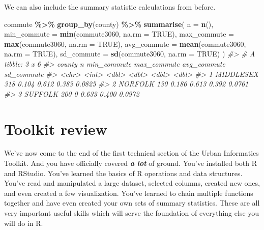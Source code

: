 \documentclass[
]{book}
\newenvironment{Shaded}{\begin{snugshade}}{\end{snugshade}}
\newcommand{\CommentTok}[1]{\textcolor[rgb]{0.56,0.35,0.01}{\textit{#1}}}
\newcommand{\DataTypeTok}[1]{\textcolor[rgb]{0.13,0.29,0.53}{#1}}
\newcommand{\KeywordTok}[1]{\textcolor[rgb]{0.13,0.29,0.53}{\textbf{#1}}}
\newcommand{\NormalTok}[1]{#1}
\newcommand{\OperatorTok}[1]{\textcolor[rgb]{0.81,0.36,0.00}{\textbf{#1}}}
\newcommand{\OtherTok}[1]{\textcolor[rgb]{0.56,0.35,0.01}{#1}}
\newcommand{\StringTok}[1]{\textcolor[rgb]{0.31,0.60,0.02}{#1}}
\begin{document}
We can also include the summary statistic calculations from before.

\begin{Shaded}
\begin{Highlighting}[]
\NormalTok{commute }\OperatorTok{\%\textgreater{}\%}\StringTok{ }
\StringTok{  }\KeywordTok{group\_by}\NormalTok{(county) }\OperatorTok{\%\textgreater{}\%}\StringTok{ }
\StringTok{  }\KeywordTok{summarise}\NormalTok{(}
    \DataTypeTok{n =} \KeywordTok{n}\NormalTok{(),}
    \DataTypeTok{min\_commute =} \KeywordTok{min}\NormalTok{(commute3060, }\DataTypeTok{na.rm =} \OtherTok{TRUE}\NormalTok{),}
    \DataTypeTok{max\_commute =} \KeywordTok{max}\NormalTok{(commute3060, }\DataTypeTok{na.rm =} \OtherTok{TRUE}\NormalTok{),}
    \DataTypeTok{avg\_commute =} \KeywordTok{mean}\NormalTok{(commute3060, }\DataTypeTok{na.rm =} \OtherTok{TRUE}\NormalTok{),}
    \DataTypeTok{sd\_commute  =} \KeywordTok{sd}\NormalTok{(commute3060, }\DataTypeTok{na.rm =} \OtherTok{TRUE}\NormalTok{)}
\NormalTok{    )}
\CommentTok{\#\textgreater{} \# A tibble: 3 x 6}
\CommentTok{\#\textgreater{}   county        n min\_commute max\_commute avg\_commute sd\_commute}
\CommentTok{\#\textgreater{}   \textless{}chr\textgreater{}     \textless{}int\textgreater{}       \textless{}dbl\textgreater{}       \textless{}dbl\textgreater{}       \textless{}dbl\textgreater{}      \textless{}dbl\textgreater{}}
\CommentTok{\#\textgreater{} 1 MIDDLESEX   318       0.104       0.612       0.383     0.0825}
\CommentTok{\#\textgreater{} 2 NORFOLK     130       0.186       0.613       0.392     0.0761}
\CommentTok{\#\textgreater{} 3 SUFFOLK     200       0           0.633       0.400     0.0972}
\end{Highlighting}
\end{Shaded}

\hypertarget{toolkit-review}{%
\chapter{Toolkit review}\label{toolkit-review}}

We've now come to the end of the first technical section of the Urban Informatics Toolkit. And you have officially covered \emph{\textbf{a lot}} of ground. You've installed both R and RStudio. You've learned the basics of R operations and data structures. You've read and manipulated a large dataset, selected columns, created new ones, and even created a few visualization. You've learned to chain multiple functions together and have even created your own sets of summary statistics. These are all very important useful skills which will serve the foundation of everything else you will do in R.
\end{document}
